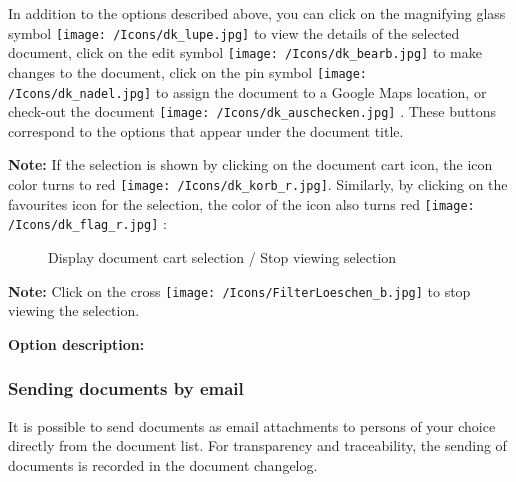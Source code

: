 In addition to the options described above, you can click on the magnifying glass symbol \texttt{[image: /Icons/dk\_lupe.jpg]}  to view the details of the selected document, click on the edit symbol \texttt{[image: /Icons/dk\_bearb.jpg]}  to make changes to the document, click on the pin symbol \texttt{[image: /Icons/dk\_nadel.jpg]}  to assign the document to a Google Maps location, or check-out the document \texttt{[image: /Icons/dk\_auschecken.jpg]} . These buttons correspond to the options that appear under the document title.

\vspace{\baselineskip}

\textbf{Note:} If the selection is shown by clicking on the document cart icon, the icon color turns to red \texttt{[image: /Icons/dk\_korb\_r.jpg]}. Similarly, by clicking on the favourites icon for the selection, the color of the icon also turns red \texttt{[image: /Icons/dk\_flag\_r.jpg]} :

\begin{figure}[H]
\caption{Display document cart selection / Stop viewing selection}
\end{figure}

\textbf{Note:} Click on the cross \texttt{[image: /Icons/FilterLoeschen\_b.jpg]}  to stop viewing the selection. 

\vspace{\baselineskip}

\textbf{Option description:}

\subsubsection{Sending documents by email}
\label{bkm:Ref201701127}

It is possible to send documents as email attachments to persons of your choice directly from the document list. For transparency and traceability, the sending of documents is recorded in the document changelog.


